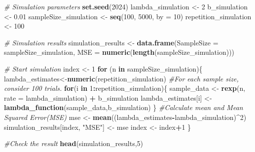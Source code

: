 \documentclass[
]{article}
\newenvironment{Shaded}{\begin{snugshade}}{\end{snugshade}}
\newcommand{\AttributeTok}[1]{\textcolor[rgb]{0.13,0.29,0.53}{#1}}
\newcommand{\CommentTok}[1]{\textcolor[rgb]{0.56,0.35,0.01}{\textit{#1}}}
\newcommand{\ControlFlowTok}[1]{\textcolor[rgb]{0.13,0.29,0.53}{\textbf{#1}}}
\newcommand{\DecValTok}[1]{\textcolor[rgb]{0.00,0.00,0.81}{#1}}
\newcommand{\FloatTok}[1]{\textcolor[rgb]{0.00,0.00,0.81}{#1}}
\newcommand{\FunctionTok}[1]{\textcolor[rgb]{0.13,0.29,0.53}{\textbf{#1}}}
\newcommand{\NormalTok}[1]{#1}
\newcommand{\OtherTok}[1]{\textcolor[rgb]{0.56,0.35,0.01}{#1}}
\newcommand{\SpecialCharTok}[1]{\textcolor[rgb]{0.81,0.36,0.00}{\textbf{#1}}}
\newcommand{\StringTok}[1]{\textcolor[rgb]{0.31,0.60,0.02}{#1}}
\begin{document}
\begin{Shaded}
\begin{Highlighting}[]
\CommentTok{\# Simulation parameters}
\FunctionTok{set.seed}\NormalTok{(}\DecValTok{2024}\NormalTok{)}
\NormalTok{lambda\_simulation }\OtherTok{\textless{}{-}} \DecValTok{2}
\NormalTok{b\_simulation }\OtherTok{\textless{}{-}} \FloatTok{0.01}
\NormalTok{sampleSize\_simulation }\OtherTok{\textless{}{-}} \FunctionTok{seq}\NormalTok{(}\DecValTok{100}\NormalTok{, }\DecValTok{5000}\NormalTok{, }\AttributeTok{by =} \DecValTok{10}\NormalTok{)}
\NormalTok{repetition\_simulation }\OtherTok{\textless{}{-}} \DecValTok{100}

\CommentTok{\# Simulation results}
\NormalTok{simulation\_results }\OtherTok{\textless{}{-}} \FunctionTok{data.frame}\NormalTok{(}\AttributeTok{SampleSize =}\NormalTok{ sampleSize\_simulation, }\AttributeTok{MSE =} \FunctionTok{numeric}\NormalTok{(}\FunctionTok{length}\NormalTok{(sampleSize\_simulation)))}


\CommentTok{\# Start simulation}
\NormalTok{index }\OtherTok{\textless{}{-}} \DecValTok{1}
\ControlFlowTok{for}\NormalTok{ (n }\ControlFlowTok{in}\NormalTok{ sampleSize\_simulation)\{}
\NormalTok{  lambda\_estimates}\OtherTok{\textless{}{-}}\FunctionTok{numeric}\NormalTok{(repetition\_simulation)}
  \CommentTok{\#For each sample size, consider 100 trials.}
  \ControlFlowTok{for}\NormalTok{(i }\ControlFlowTok{in} \DecValTok{1}\SpecialCharTok{:}\NormalTok{repetition\_simulation)\{}
\NormalTok{    sample\_data }\OtherTok{\textless{}{-}} \FunctionTok{rexp}\NormalTok{(n, }\AttributeTok{rate =}\NormalTok{ lambda\_simulation) }\SpecialCharTok{+}\NormalTok{ b\_simulation}
\NormalTok{    lambda\_estimates[i] }\OtherTok{\textless{}{-}} \FunctionTok{lambda\_function}\NormalTok{(sample\_data,b\_simulation)}
\NormalTok{  \}}
  \CommentTok{\#Calculate mean and Mean Squared Error(MSE)}
\NormalTok{  mse }\OtherTok{\textless{}{-}} \FunctionTok{mean}\NormalTok{((lambda\_estimates}\SpecialCharTok{{-}}\NormalTok{lambda\_simulation)}\SpecialCharTok{\^{}}\DecValTok{2}\NormalTok{)}
\NormalTok{  simulation\_results[index, }\StringTok{"MSE"}\NormalTok{] }\OtherTok{\textless{}{-}}\NormalTok{ mse}
\NormalTok{  index }\OtherTok{\textless{}{-}}\NormalTok{ index}\SpecialCharTok{+}\DecValTok{1}
\NormalTok{\}}

\CommentTok{\#Check the result}
\FunctionTok{head}\NormalTok{(simulation\_results,}\DecValTok{5}\NormalTok{)}
\end{Highlighting}
\end{Shaded}
\end{document}
